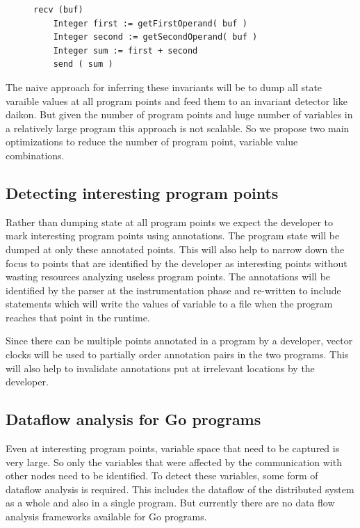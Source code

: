 \begin{figure}
\begin{lstlisting}[caption={Sample code for Communication between 2 nodes - Node 1}, label=lst:node1]
    recv (buf)
    Integer first := getFirstOperand( buf )
    Integer second := getSecondOperand( buf )
    Integer sum := first + second
    send ( sum )
\end{lstlisting}
\end{figure}

The naive approach for inferring these invariants will be to dump all
state varaible values at all program points and feed them to an
invariant detector like daikon\cite{ernst2007daikon}. But given the
number of program points and huge number of variables in a relatively
large program this approach is not scalable. So we propose two main
optimizations to reduce the number of program point, variable value
combinations.

\subsection{Detecting interesting program points}

Rather than dumping state at all program points we expect the
developer to mark interesting program points using annotations. The
program state will be dumped at only these annotated points. This will
also help to narrow down the focus to points that are identified by
the developer as interesting points without wasting resources
analyzing useless program points. The annotations will be identified
by the parser at the instrumentation phase and re-written to include
statements which will write the values of variable to a file when the
program reaches that point in the runtime.

Since there can be multiple points annotated in a program by a
developer, vector clocks will be used to partially order annotation
pairs in the two programs. This will also help to invalidate
annotations put at irrelevant locations by the developer.

\subsection{Dataflow analysis for Go programs}

Even at interesting program points, variable space that need to be
captured is very large. So only the variables that were affected by
the communication with other nodes need to be identified. To detect
these variables, some form of dataflow analysis is required. This
includes the dataflow of the distributed system as a whole and also in
a single program. But currently there are no data flow analysis
frameworks available for Go programs.

